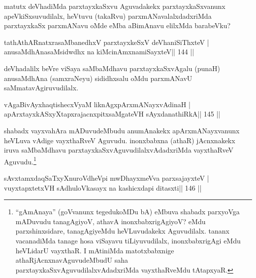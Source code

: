\begin{artha}
matutx deVhadiMda parxtayxkaSxvu Aguvadakekx parxtayxkaSxvanunx apeVkiSxsuvudilalx, heVtuvu (takaRvu) parxmANavalalxdadxriMda parxtayxkaSx parxmANavu oMde eMba aBimAnavu elilxMda barabeVku?
\end{artha}

\begin{shl}
\footnotemark[4]tathA\s thARnatxrasaMbanedhxV parxtayxkeSxV deVhaniSiThxteV |
anusaMdhAnasaMsidwdhx na kiMcinAmxnamiSayxteV\hfill || 144 ||
\end{shl}

\begin{artha}
deVhadalilx beVre viSaya saMbaMdhavu parxtayxkaSxvAgalu (punaH) 
anusaMdhAna (samxraNeyu) sididhxsalu oMdu parxmANavU saMmatavAgiruvudilalx. 
\end{artha}


\begin{shl}
vAgaBivAyxhaqtishecxVyaM liknAgxpArxmANayxvAdinaH |
apArxtayxkASxyXtapxrajacnxpitxsaMgateVH sAyxdanathiRkA\hfill || 145 ||
\end{shl}

\begin{artha}
shabadx vayxvahAra mADuvudeMbudu anumAnakekx apArxmANayxvanunx heVLuva 
vAdige vayxthaRveV Aguvudu. inonxbabxna (athaR) jAcnxnakekx iruva 
saMbaMdhavu parxtayxkaSxvAguvudilalxvAdadxriMda vayxthaRveV 
Aguvudu.\footnote[5]{``gAmAnaya'' (goVvanunx tegedukoMDu bA) eMbuva 
shabadx parxyoVga mADuvudu tanagAgiyoV, athavA inonxbabxrigAgiyoV? eMdu parxshinxsidare, tanagAgiyeMdu heVLuvudakekx Aguvudilalx. tananx vacanadiMda tanage hosa viSayavu tiLiyuvudilalx, inonxbabxrigAgi eMdu heVLidarU vayxthaR. I mAtiniMda matotxbabxnige athaRjAcnxnavAguvudeMbudU saha parxtayxkaSxvAguvudilalxvAdadxriMda vayxthaRveMdu tAtapxyaR.}
\end{artha}

\begin{shl}
sAvxtamxdaqSaTxyXnuroVdheV\s pi mwDhayxmeVva parxsajayxteV |
vuyxtapxtetxVH sAdhuloVkasayx na kashicxdapi ditasxti\hfill || 146 ||
\end{shl}

